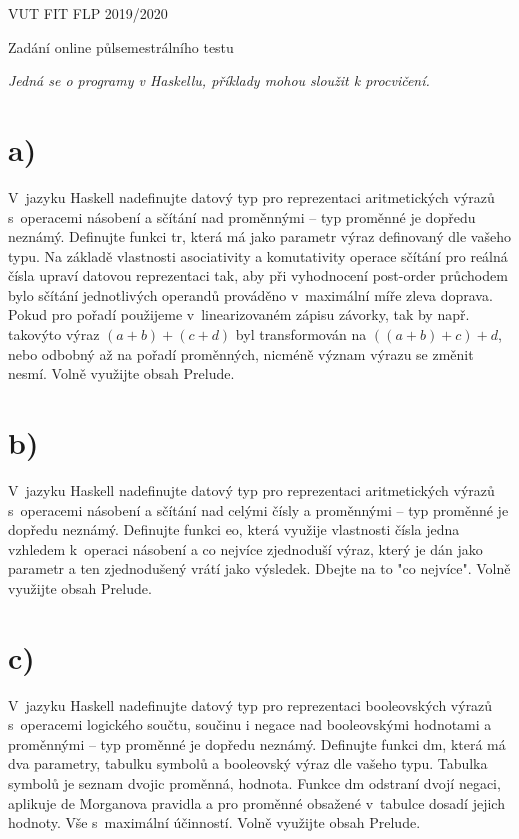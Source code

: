 \documentclass[11pt, a4paper, titlepage]{article}
\begin{document}
\begin{center}
    \Large VUT FIT FLP 2019/2020
    \bigskip

    \Large Zadání online půlsemestrálního testu
    \bigskip

    \large \textit{Jedná se o programy v Haskellu, příklady mohou sloužit k procvičení.}
\end{center}

\section*{a)}

V~jazyku Haskell nadefinujte datový typ pro reprezentaci aritmetických výrazů s~operacemi násobení a sčítání nad proměnnými -- typ proměnné je dopředu neznámý. Definujte funkci tr, která má jako parametr výraz definovaný dle vašeho typu. Na základě vlastnosti asociativity a komutativity operace sčítání pro reálná čísla upraví datovou reprezentaci tak, aby při vyhodnocení post-order průchodem bylo sčítání jednotlivých operandů prováděno v~maximální míře zleva doprava. Pokud pro pořadí použijeme v~linearizovaném zápisu závorky, tak by např. takovýto výraz $(a+b)+(c+d)$ byl transformován na $((a+b)+c)+d$, nebo odbobný až na pořadí proměnných, nicméně význam výrazu se změnit nesmí. Volně využijte obsah Prelude.

\section*{b)}

V~jazyku Haskell nadefinujte datový typ pro reprezentaci aritmetických výrazů s~operacemi násobení a sčítání nad celými čísly a proměnnými -- typ proměnné je dopředu neznámý. Definujte funkci eo, která využije vlastnosti čísla jedna vzhledem k~operaci násobení a co nejvíce zjednoduší výraz, který je dán jako parametr a ten zjednodušený vrátí jako výsledek. Dbejte na to "co nejvíce". Volně využijte obsah Prelude.

\section*{c)}

V~jazyku Haskell nadefinujte datový typ pro reprezentaci booleovských výrazů s~operacemi logického součtu, součinu i negace nad booleovskými hodnotami a proměnnými -- typ proměnné je dopředu neznámý. Definujte funkci dm, která má dva parametry, tabulku symbolů a booleovský výraz dle vašeho typu. Tabulka symbolů je seznam dvojic proměnná, hodnota. Funkce dm odstraní dvojí negaci, aplikuje de Morganova pravidla a pro proměnné obsažené v~tabulce dosadí jejich hodnoty. Vše s~maximální účinností. Volně využijte obsah Prelude.
\end{document}
